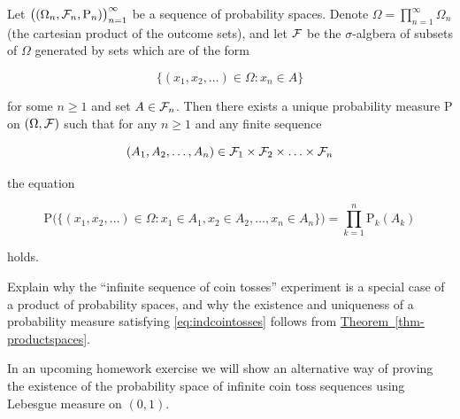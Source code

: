\begin{thm}
\label{thm-productspaces}
Let
$\big((\Omega_n, {\cal F}_n,
\mathrm{P}_n)\big)_{n=1}^\infty$
be a sequence of probability spaces. Denote
$\Omega = \prod_{n=1}^\infty \Omega_n$ (the cartesian
product of the outcome sets), and let ${\cal F}$ be
the $\sigma$-algbera of subsets of $\Omega$ generated
by sets which are of the form

\[
\{ (x_1,x_2,\ldots) \in \Omega : x_n \in A \}
\]

\noindent for some $n\ge1$ and set $A \in {\cal F}_n$. Then
there exists a unique probability measure $\mathrm{P}$
on $(\Omega, {\cal F})$ such that for any $n\ge 1$
and any finite sequence

\[
(A_1, A_2, \ldots, A_n) \in {\cal F}_1 \times {\cal F}_2
\times \ldots \times {\cal F}_n
\]

\noindent the equation

\[
\mathrm{P}\Big(\big\{ (x_1,x_2,\ldots ) \in \Omega : x_1\in A_1, x_2 \in A_2, \ldots, x_n \in A_n \big\} \Big)
=
\prod_{k=1}^n \mathrm{P}_k(A_k)
\]

\noindent holds.
\end{thm}

\begin{xexercise}
Explain why the ``infinite sequence of coin tosses''
experiment is a special case of  a product of
probability spaces, and why the existence and
uniqueness of a probability measure satisfying
\eqref{eq:indcointosses} follows from \texorpdfstring{\hyperref[thm-productspaces]{Theorem~\ref*{thm-productspaces}}}{Theorem}.
\end{xexercise}

\noindent In an upcoming homework exercise we will show an
alternative way of proving the existence of the
probability space of infinite coin toss sequences
using Lebesgue measure on $(0,1)$.
